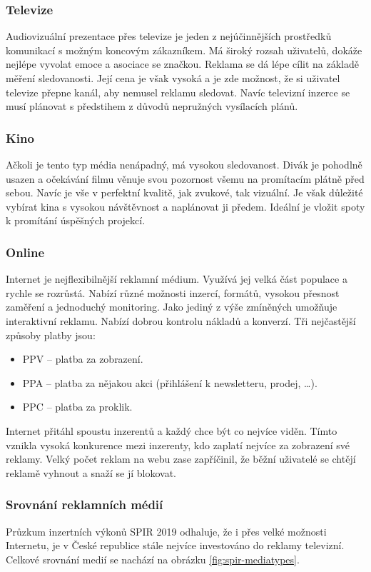     \subsubsection{Televize}
    Audiovizuální prezentace přes televize je jeden z nejúčinnějších prostředků komunikací s možným koncovým zákazníkem.
    Má široký rozsah uživatelů, dokáže nejlépe vyvolat emoce a asociace se značkou. Reklama se dá lépe cílit na základě měření sledovanosti.
    Její cena je však vysoká a je zde možnost, že si uživatel televize přepne kanál, aby nemusel reklamu sledovat.
    Navíc televizní inzerce se musí plánovat s předstihem z důvodů nepružných vysílacích plánů.
    
    \subsubsection{Kino}
    Ačkoli je tento typ média nenápadný, má vysokou sledovanost. Divák je pohodlně usazen a očekávání filmu věnuje svou pozornost všemu na promítacím plátně před sebou.
    Navíc je vše v perfektní kvalitě, jak zvukové, tak vizuální. Je však důležité vybírat kina s vysokou návštěvnost a naplánovat ji předem.
    Ideální je vložit spoty k promítání úspěšných projekcí.

    \subsubsection{Online}
    Internet je nejflexibilnější reklamní médium. Využívá jej velká část populace a rychle se rozrůstá. Nabízí různé možnosti inzercí, formátů,
    vysokou přesnost zaměření a jednoduchý monitoring. Jako jediný z výše zmíněných umožňuje interaktivní reklamu. Nabízí dobrou kontrolu nákladů a konverzí.
    Tři nejčastější způsoby platby jsou:
    \begin{itemize}
        \item PPV -- platba za zobrazení.
        \item PPA -- platba za nějakou akci (přihlášení k newsletteru, prodej, \ldots).
        \item PPC -- platba za proklik.
    \end{itemize}
    Internet přitáhl spoustu inzerentů a každý chce být co nejvíce viděn. Tímto vznikla vysoká konkurence mezi inzerenty, kdo zaplatí nejvíce za zobrazení své reklamy.
    Velký počet reklam na webu zase zapříčinil, že běžní uživatelé se chtějí reklamě vyhnout a snaží se jí blokovat.
    
    \subsubsection{Srovnání reklamních médií}
    Průzkum inzertních výkonů SPIR 2019 odhaluje, že i přes velké možnosti Internetu, je v České republice stále nejvíce investováno do reklamy televizní.
    Celkové srovnání medií se nachází na obrázku \ref{fig:spir-mediatypes}.


